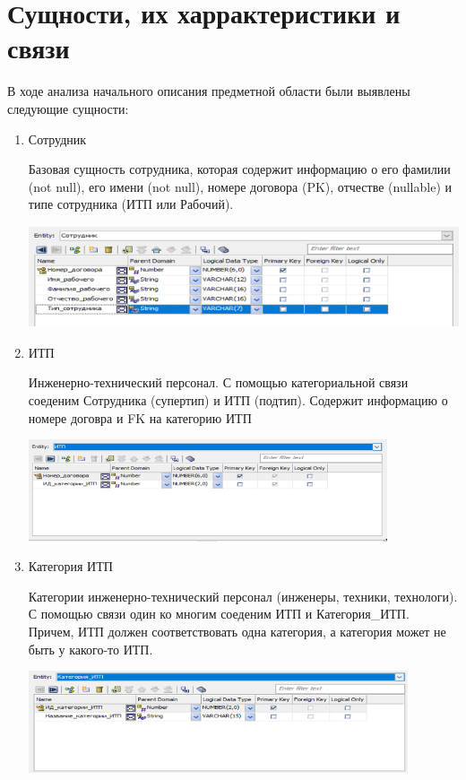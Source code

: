 \section{Сущности, их харрактеристики и связи}
В ходе анализа начального описания предметной области были выявлены следующие сущности:

\begin{enumerate}

    \item Сотрудник

    Базовая сущность сотрудника, которая содержит информацию о его фамилии (not null), его имени (not null), номере договора (PK), отчестве (nullable) и типе сотрудника (ИТП или Рабочий).

    \includegraphics[height=3cm]{screenshots/entities/employee.png}

    \item ИТП

    Инженерно-технический персонал. С помощью категориальной связи соеденим Сотрудника (супертип) и ИТП (подтип).
    Содержит информацию о номере договра и FK на категорию ИТП

    \includegraphics[height=3cm]{screenshots/entities/itp.png}

    \item Категория ИТП

    Категории инженерно-технический персонал (инженеры, техники, технологи).
    С помощью связи один ко многим соеденим ИТП и Категория\_ИТП.
    Причем, ИТП должен соответствовать одна категория, а категория может не быть у какого-то ИТП.

    \includegraphics[height=3cm]{screenshots/entities/category_itp.png}


\end{enumerate}
